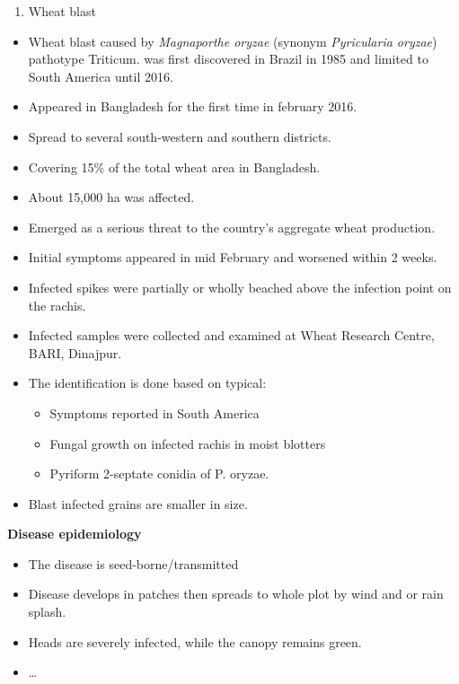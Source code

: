 \documentclass[
  openany]{book}
\providecommand{\tightlist}{%
  \setlength{\itemsep}{0pt}\setlength{\parskip}{0pt}}
\begin{document}
\begin{enumerate}
\def\labelenumi{\arabic{enumi}.}
\setcounter{enumi}{5}
\tightlist
\item
  Wheat blast
\end{enumerate}

\begin{itemize}
\tightlist
\item
  Wheat blast caused by \emph{Magnaporthe oryzae} (synonym \emph{Pyricularia oryzae}) pathotype Triticum. was first discovered in Brazil in 1985 and limited to South America until 2016.
\item
  Appeared in Bangladesh for the first time in february 2016.
\item
  Spread to several south-western and southern districts.
\item
  Covering 15\% of the total wheat area in Bangladesh.
\item
  About 15,000 ha was affected.
\item
  Emerged as a serious threat to the country's aggregate wheat production.
\item
  Initial symptoms appeared in mid February and worsened within 2 weeks.
\item
  Infected spikes were partially or wholly beached above the infection point on the rachis.
\item
  Infected samples were collected and examined at Wheat Research Centre, BARI, Dinajpur.
\item
  The identification is done based on typical:

  \begin{itemize}
  \tightlist
  \item
    Symptoms reported in South America
  \item
    Fungal growth on infected rachis in moist blotters
  \item
    Pyriform 2-septate conidia of P. oryzae.
  \end{itemize}
\item
  Blast infected grains are smaller in size.
\end{itemize}

\textbf{Disease epidemiology}

\begin{itemize}
\tightlist
\item
  The disease is seed-borne/transmitted
\item
  Disease develops in patches then spreads to whole plot by wind and or rain splash.
\item
  Heads are severely infected, while the canopy remains green.
\item
  \ldots{}
\end{itemize}
\end{document}
